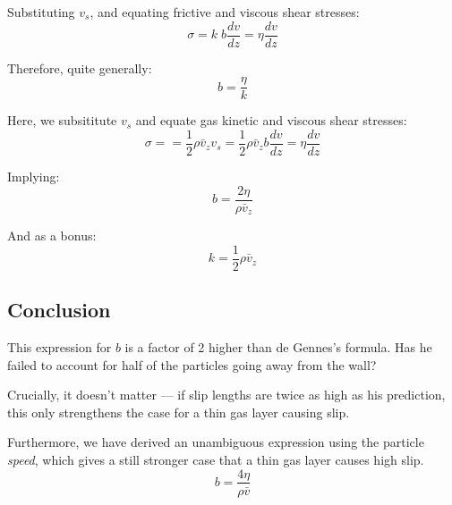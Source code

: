 \documentclass{paper}
\begin{document}
Substituting $v_{s}$, and equating frictive and viscous shear stresses:
\[ \sigma = k\; b \frac{dv}{dz} = \eta \frac{dv}{dz} \]

Therefore, quite generally: \[ b = \frac{\eta}{k} \]

\vspace{2em}
Here, we subsititute $v_{s}$ and equate gas kinetic and viscous shear stresses:
\[ \sigma = = \frac{1}{2} \rho \bar{v}_{z} v_{s} = 
\frac{1}{2} \rho \bar{v}_{z} b \frac{dv}{dz} = \eta \frac{dv}{dz} \]

Implying:
\[ b = \frac{2 \eta}{ \rho \bar{v}_{z}} \]

And as a bonus: 
\[ k = \frac{1}{2} \rho \bar{v}_{z} \]



\subsection*{Conclusion}
This expression for $b$ is a factor of 2 higher than de Gennes's formula.  Has he failed to account for half of the particles going away from the wall?  

\vspace{1em}
Crucially, it doesn't matter --- if slip lengths are twice as high as his prediction, this only strengthens the case for a thin gas layer causing slip.

Furthermore, we have derived an unambiguous expression using the particle \emph{speed}, which gives a still stronger case that a thin gas layer causes high slip.
\[ b = \frac{4 \eta}{\rho \bar{v}} \]
\end{document}
